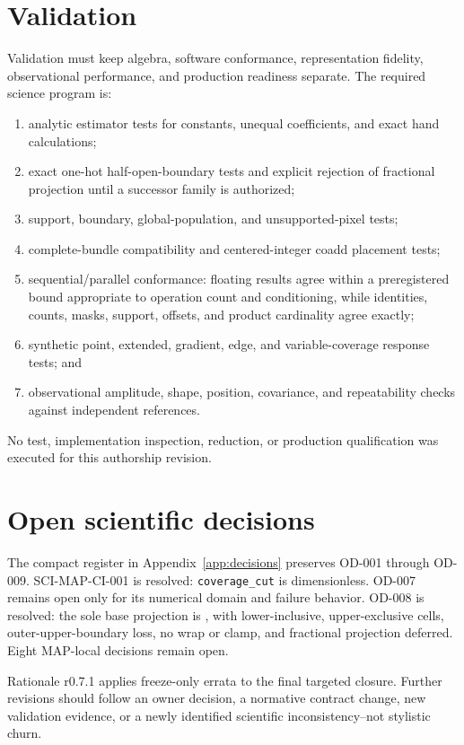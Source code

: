\documentclass[10pt]{article}
\newcommand{\code}[1]{\nolinkurl{#1}}
\begin{document}
\section{Validation}\label{sec:validation}
Validation must keep algebra, software conformance, representation fidelity,
observational performance, and production readiness separate. The required
science program is:
\begin{enumerate}[label=\textbf{\arabic*.},leftmargin=*]
\item analytic estimator tests for constants, unequal coefficients, and exact
hand calculations;
\item exact one-hot half-open-boundary tests and explicit rejection of
fractional projection until a successor family is authorized;
\item support, boundary, global-population, and unsupported-pixel tests;
\item complete-bundle compatibility and centered-integer coadd placement
tests;
\item sequential/parallel conformance: floating results agree within a
preregistered bound appropriate to operation count and conditioning, while
identities, counts, masks, support, offsets, and product cardinality agree
exactly;
\item synthetic point, extended, gradient, edge, and variable-coverage
response tests; and
\item observational amplitude, shape, position, covariance, and repeatability
checks against independent references.
\end{enumerate}
No test, implementation inspection, reduction, or production qualification
was executed for this authorship revision.

\section{Open scientific decisions}\label{sec:decisions}
The compact register in Appendix~\ref{app:decisions} preserves OD-001 through
OD-009. SCI-MAP-CI-001 is resolved: \code{coverage_cut} is dimensionless.
OD-007 remains open only for its numerical domain and failure behavior.
OD-008 is resolved: the sole base projection is
\SCIMapOneHotProfile, with lower-inclusive,
upper-exclusive cells, outer-upper-boundary loss, no wrap or clamp, and
fractional projection deferred. Eight MAP-local decisions remain open.

Rationale r0.7.1 applies freeze-only errata to the final targeted closure.
Further revisions should follow an owner decision, a normative contract
change, new validation evidence, or a newly identified scientific
inconsistency--not stylistic churn.
\end{document}

